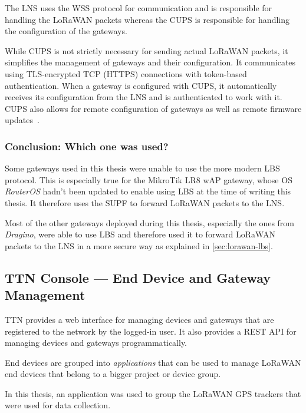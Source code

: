 The \ac{LNS} uses the \ac{WSS} protocol for communication and is responsible for handling the \ac{LoRaWAN} packets whereas the \acl{CUPS} is responsible for handling the configuration of the gateways.

While \ac{CUPS} is not strictly necessary for sending actual \ac{LoRaWAN} packets, it simplifies the management of gateways and their configuration.
It communicates using \ac{TLS}-encrypted \ac{TCP} (\ac{HTTPS}) connections with token-based authentication.
When a gateway is configured with \ac{CUPS}, it automatically receives its configuration from the \ac{LNS} and is authenticated to work with it.
\ac{CUPS} also allows for remote configuration of gateways as well as remote firmware updates~\cite{the_things_industries_bv_lora_2022}.

\subsubsection{Conclusion: Which one was used?}

Some gateways used in this thesis were unable to use the more modern \acl{LBS} protocol.
This is especially true for the MikroTik LR8 wAP gateway, whose \ac{OS} \emph{RouterOS} hadn't been updated to enable using \ac{LBS} at the time of writing this thesis.
It therefore uses the \ac{SUPF} to forward \ac{LoRaWAN} packets to the \ac{LNS}.

Most of the other gateways deployed during this thesis, especially the ones from \emph{Dragino}, were able to use \ac{LBS} and therefore used it to forward \ac{LoRaWAN} packets to the \ac{LNS} in a more secure way as explained in \cref{sec:lorawan-lbs}.

\subsection{\acl{TTN} Console — End Device and Gateway Management}\label{sec:web-interface-and-device-gateway-management}

\ac{TTN} provides a web interface for managing devices and gateways that are registered to the network by the logged-in user.
It also provides a \ac{REST} \ac{API} for managing devices and gateways programmatically.

End devices are grouped into \emph{applications} that can be used to manage \ac{LoRaWAN} end devices that belong to a bigger project or device group.

In this thesis, an application was used to group the \ac{LoRaWAN} \ac{GPS} trackers that were used for data collection.

